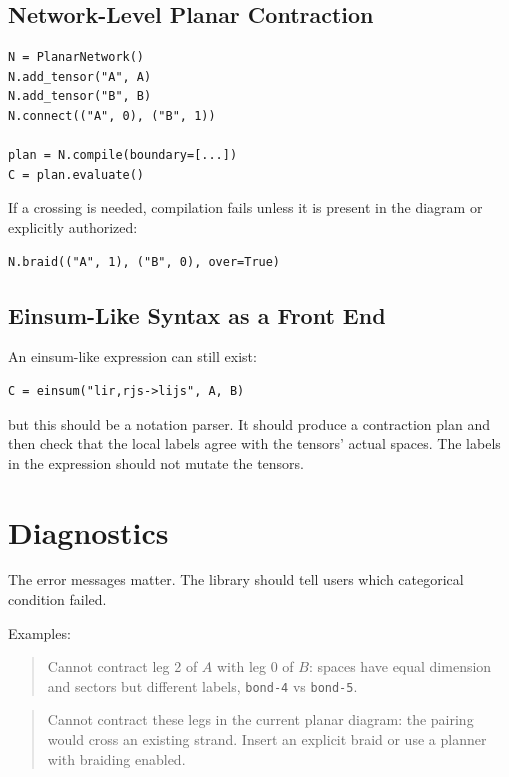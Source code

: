 \documentclass[11pt]{article}
\begin{document}
\subsection{Network-Level Planar Contraction}

\begin{verbatim}
N = PlanarNetwork()
N.add_tensor("A", A)
N.add_tensor("B", B)
N.connect(("A", 0), ("B", 1))

plan = N.compile(boundary=[...])
C = plan.evaluate()
\end{verbatim}

If a crossing is needed, compilation fails unless it is present in the
diagram or explicitly authorized:

\begin{verbatim}
N.braid(("A", 1), ("B", 0), over=True)
\end{verbatim}

\subsection{Einsum-Like Syntax as a Front End}

An einsum-like expression can still exist:

\begin{verbatim}
C = einsum("lir,rjs->lijs", A, B)
\end{verbatim}

but this should be a notation parser.  It should produce a contraction
plan and then check that the local labels agree with the tensors'
actual spaces.  The labels in the expression should not mutate the
tensors.

\section{Diagnostics}

The error messages matter.  The library should tell users which
categorical condition failed.

Examples:

\begin{quote}
Cannot contract leg 2 of \(A\) with leg 0 of \(B\): spaces have equal
dimension and sectors but different labels, \texttt{bond-4} vs
\texttt{bond-5}.
\end{quote}

\begin{quote}
Cannot contract these legs in the current planar diagram: the pairing
would cross an existing strand.  Insert an explicit braid or use a
planner with braiding enabled.
\end{quote}
\end{document}
